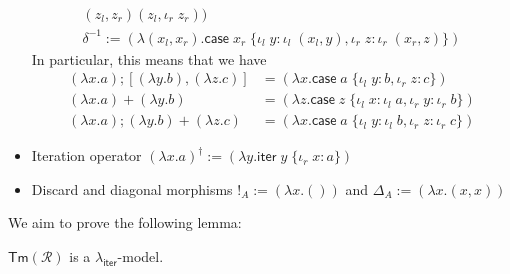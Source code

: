 \documentclass[acmsmall,screen,review]{acmart}
\newcommand{\mc}[1]{\ensuremath{\mathcal{#1}}}
\newcommand{\ms}[1]{\ensuremath{\mathsf{#1}}}
\newcommand{\lto}{:}
\newcommand{\linl}[1]{\iota_l\;{#1}}
\newcommand{\linr}[1]{\iota_r\;{#1}}
\newcommand{\caseexpr}[5]{\ms{case}\;#1\;\{\linl{#2} \lto #3, \linr{#4} \lto #5\}}
\newcommand{\liter}[3]{\ms{iter}\;#1\;\{ \linr{#2} \lto #3 \}}
\newcommand{\tmor}[1]{{!}_{#1}}
\newcommand{\dmor}[1]{{\Delta}_{#1}}
\newcommand{\subiterexp}{\texorpdfstring{\(\lambda_{\ms{iter}}\)}{lambda-iter}}
\begin{document}
\begin{itemize}
\begin{gather*}
                          {(z_l, z_r)}{(z_l, \linr{z_r})}) \\
    \delta^{-1} := (\lambda (x_l, x_r). \caseexpr{x_r}{y}{\linl{(x_l, y)}}{z}{\linr{(x_r, z)}})
  \end{gather*}
  In particular, this means that we have
  \begin{align*}
    (\lambda x . a) ; [(\lambda y . b), (\lambda z . c)]
      &= (\lambda x . \caseexpr{a}{y}{b}{z}{c})
      \\
    (\lambda x . a) + (\lambda y . b) &= (\lambda z. \caseexpr{z}{x}{\linl{a}}{y}{\linr{b}})
      \\
    (\lambda x . a) ; (\lambda y . b) + (\lambda z . c)
      &= (\lambda x . \caseexpr{a}{y}{\linl{b}}{z}{\linr{c}})
  \end{align*}
  \item Iteration operator
  $
    (\lambda x. a)^\dagger := (\lambda y. \liter{y}{x}{a})
  $
  \item Discard and diagonal morphisms $\tmor{A} := (\lambda x. ())$ and $\dmor{A} := (\lambda x.
  (x, x))$
\end{itemize}
We aim to prove the following lemma:
\begin{lemma}
  $\ms{Tm}(\mc{R})$ is a \subiterexp{}-model.
\end{lemma}
\end{document}
